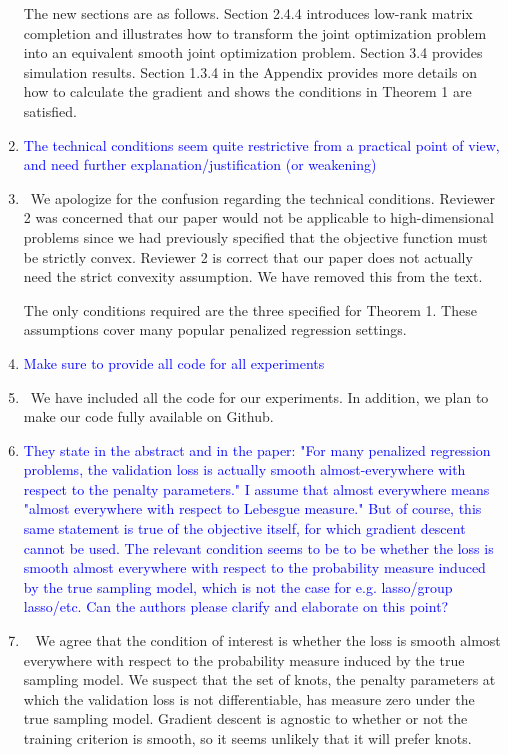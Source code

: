 \documentclass[]{article}
\newcommand{\point}[1]{\item \textcolor{blue}{#1}}
\newcommand{\reply}{\item[]\ }
\begin{document}
\begin{enumerate}
		The new sections are as follows. Section 2.4.4 introduces low-rank matrix completion and illustrates how to transform the joint optimization problem into an equivalent smooth joint optimization problem. Section 3.4 provides simulation results. Section 1.3.4 in the Appendix provides more details on how to calculate the gradient and shows the conditions in Theorem 1 are satisfied. 
		
		
		\point{The technical conditions seem quite restrictive from a practical point of view, and need further explanation/justification (or weakening)}
		
		\reply We apologize for the confusion regarding the technical conditions. Reviewer 2 was concerned that our paper would not be applicable to high-dimensional problems since we had previously specified that the objective function must be strictly convex. Reviewer 2 is correct that our paper does not actually need the strict convexity assumption. We have removed this from the text.
		
		The only conditions required are the three specified for Theorem 1. These assumptions cover many popular penalized regression settings.
		
		\point{Make sure to provide all code for all experiments}
		
		\reply We have included all the code for our experiments. In addition, we plan to make our code fully available on Github.
		
		\point{They state in the abstract and in the paper: "For many penalized regression problems, the validation loss is actually smooth almost-everywhere with respect to the penalty parameters."  I assume that almost everywhere means "almost everywhere with respect to Lebesgue measure."  But of course, this same statement is true of the objective itself, for which gradient descent cannot be used.  The relevant condition seems to be to be whether the loss is smooth almost everywhere with respect to the probability measure induced by the true sampling model, which is not the case for e.g. lasso/group lasso/etc.  Can the authors please clarify and elaborate on this point?}
		
		\reply 	
		We agree that the condition of interest is whether the loss is smooth almost everywhere with respect to the probability measure induced by the true sampling model. We suspect that the set of knots, the penalty parameters at which the validation loss is not differentiable, has measure zero under the true sampling model. Gradient descent is agnostic to whether or not the training criterion is smooth, so it seems unlikely that it will prefer knots.
		

\end{enumerate}
\end{document}
